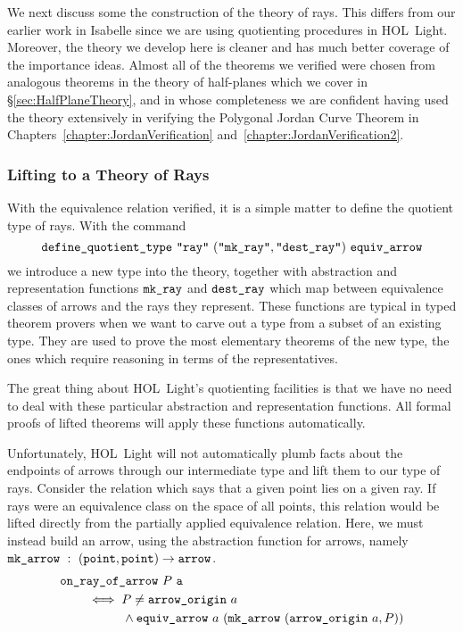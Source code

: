 We next discuss some the construction of the theory of rays. This differs from our earlier work in Isabelle since we are using quotienting procedures in HOL~Light. Moreover, the theory we develop here is cleaner and has much better coverage of the importance ideas. Almost all of the theorems we verified were chosen from analogous theorems in the theory of half-planes which we cover in \S\ref{sec:HalfPlaneTheory}, and in whose completeness we are confident having used the theory extensively in verifying the Polygonal Jordan Curve Theorem in Chapters~\ref{chapter:JordanVerification} and~\ref{chapter:JordanVerification2}.

\subsubsection{Lifting to a Theory of Rays}
With the equivalence relation verified, it is a simple matter to define the quotient type of rays. With the command
\begin{displaymath}
  \code{define\_quotient\_type}\ \code{"ray"}\ (\code{"mk\_ray"},\code{"dest\_ray"})\ \code{equiv\_arrow}
\end{displaymath}
we introduce a new type  into the theory, together with abstraction and representation functions $\texttt{mk\_ray}$ and $\texttt{dest\_ray}$ which map between equivalence classes of arrows and the rays they represent. These functions are typical in typed theorem provers when we want to carve out a type from a subset of an existing type. They are used to prove the most elementary theorems of the new type, the ones which require reasoning in terms of the representatives.

The great thing about HOL~Light's quotienting facilities is that we have no need to deal with these particular abstraction and representation functions. All formal proofs of lifted theorems will apply these functions automatically. 

Unfortunately, HOL~Light will not automatically plumb facts about the endpoints of arrows through our intermediate type and lift them to our type of rays. Consider the relation which says that a given point lies on a given ray. If rays were an equivalence class on the space of all points, this relation would be lifted directly from the partially applied equivalence relation. Here, we must instead build an arrow, using the abstraction function for arrows, namely $\code{mk\_arrow}\ :\ (\code{point},\code{point})\rightarrow\code{arrow}$.
\begin{equation}
  \begin{split}
    &\code{on\_ray\_of\_arrow}\ P\ \code{a}\\
    &\qquad\iff P \neq \code{arrow\_origin}\ a\\
    &\qquad\qquad\quad\wedge \code{equiv\_arrow}\ a\ (\code{mk\_arrow}\ (\code{arrow\_origin}\ a, P))
  \end{split}
\end{equation}

